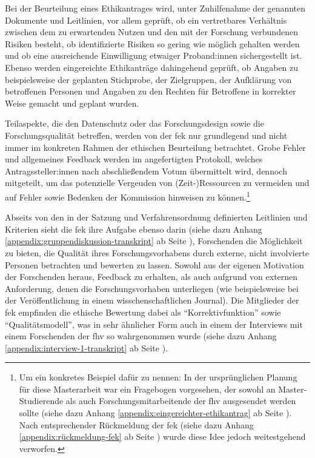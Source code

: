 \documentclass[a4paper,12pt,twoside]{scrreprt}
\begin{document}
Bei der Beurteilung eines Ethikantrages wird, unter Zuhilfenahme der genannten Dokumente und Leitlinien, vor allem geprüft, ob ein vertretbares Verhältnis zwischen dem zu erwartenden Nutzen und den mit der Forschung verbundenen Risiken besteht, ob identifizierte Risiken so gering wie möglich gehalten werden und ob eine ausreichende Einwilligung etwaiger Proband:innen sichergestellt ist. Ebenso werden eingereichte Ethikanträge dahingehend geprüft, ob Angaben zu beispielsweise der geplanten Stichprobe, der Zielgruppen, der Aufklärung von betroffenen Personen und Angaben zu den Rechten für Betroffene in korrekter Weise gemacht und geplant wurden. \cite[1\psq]{forschungsethik-kommission_der_fachhochschule_vorarlberg_verfahrensordnung_2020}

Teilaspekte, die den Datenschutz oder das Forschungsdesign sowie die Forschungsqualität betreffen, werden von der \ac{fek} nur grundlegend und nicht immer im konkreten Rahmen der ethischen Beurteilung betrachtet. Grobe Fehler und allgemeines Feedback werden im angefertigten Protokoll, welches Antragssteller:innen nach abschließendem Votum übermittelt wird, dennoch mitgeteilt, um das potenzielle Vergeuden von (Zeit-)Ressourcen zu vermeiden und auf Fehler sowie Bedenken der Kommission hinweisen zu können.\footnote{Um ein konkretes Beispiel dafür zu nennen: In der ursprünglichen Planung für diese Masterarbeit war ein Fragebogen vorgesehen, der sowohl an Master-Studierende als auch Forschungsmitarbeitende der \ac{fhv} ausgesendet werden sollte (siehe dazu Anhang \ref{appendix:eingereichter-ethikantrag} ab Seite \pageref{appendix:eingereichter-ethikantrag}). Nach entsprechender Rückmeldung der \ac{fek} (siehe dazu Anhang \ref{appendix:rückmeldung-fek} ab Seite \pageref{appendix:rückmeldung-fek}) wurde diese Idee jedoch weitestgehend verworfen.} \cite[1\psq]{forschungsethik-kommission_der_fachhochschule_vorarlberg_verfahrensordnung_2020}

\medskip

Abseits von den in der Satzung und Verfahrensordnung definierten Leitlinien und Kriterien sieht die \ac{fek} ihre Aufgabe ebenso darin (siehe dazu Anhang \ref{appendix:gruppendiskussion-transkript} ab Seite \pageref{appendix:gruppendiskussion-transkript}), Forschenden die Möglichkeit zu bieten, die Qualität ihres Forschungsvorhabens durch externe, nicht involvierte Personen betrachten und bewerten zu lassen. Sowohl aus der eigenen Motivation der Forschenden heraus, Feedback zu erhalten, als auch aufgrund von externen Anforderung, denen die Forschungsvorhaben unterliegen (wie beispielsweise bei der Veröffentlichung in einem wisschenschaftlichen Journal). Die Mitglieder der \ac{fek} empfinden die ethische Bewertung dabei als \enquote{Korrektivfunktion} sowie \enquote{Qualitätsmodell}, was in sehr ähnlicher Form auch in einem der Interviews mit einem Forschenden der \ac{fhv} so wahrgenommen wurde (siehe dazu Anhang \ref{appendix:interview-1-transkript} ab Seite \pageref{appendix:interview-1-transkript}).
\end{document}
